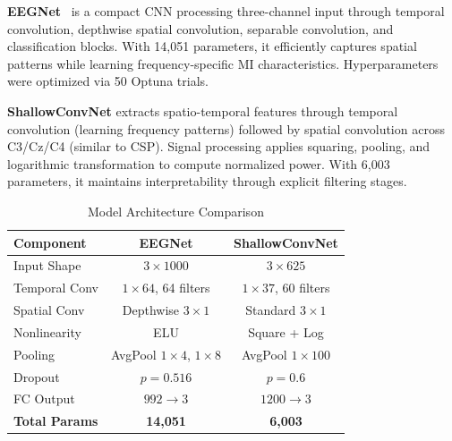 \textbf{EEGNet}~\cite{lawhern2018eegnet} is a compact CNN processing three-channel input through temporal convolution, depthwise spatial convolution, separable convolution, and classification blocks. With 14,051 parameters, it efficiently captures spatial patterns while learning frequency-specific MI characteristics. Hyperparameters were optimized via 50 Optuna trials.

\textbf{ShallowConvNet} extracts spatio-temporal features through temporal convolution (learning frequency patterns) followed by spatial convolution across C3/Cz/C4 (similar to CSP). Signal processing applies squaring, pooling, and logarithmic transformation to compute normalized power. With 6,003 parameters, it maintains interpretability through explicit filtering stages.

\begin{table}[ht]
\small
\centering
\caption{Model Architecture Comparison}
\label{tab:architecture_comparison}
\renewcommand{\arraystretch}{1.1}
\begin{tabular}{|l|c|c|}
\hline
\textbf{Component} & \textbf{EEGNet} & \textbf{ShallowConvNet} \\
\hline
Input Shape & $3 \times 1000$ & $3 \times 625$ \\
Temporal Conv & $1 \times 64$, 64 filters & $1 \times 37$, 60 filters \\
Spatial Conv & Depthwise $3 \times 1$ & Standard $3 \times 1$ \\
Nonlinearity & ELU & Square + Log \\
Pooling & AvgPool $1\times4$, $1\times8$ & AvgPool $1\times100$ \\
Dropout & $p=0.516$ & $p=0.6$ \\
FC Output & $992 \rightarrow 3$ & $1200 \rightarrow 3$ \\
\hline
\textbf{Total Params} & \textbf{14,051} & \textbf{6,003} \\
\hline
\end{tabular}
\end{table}



